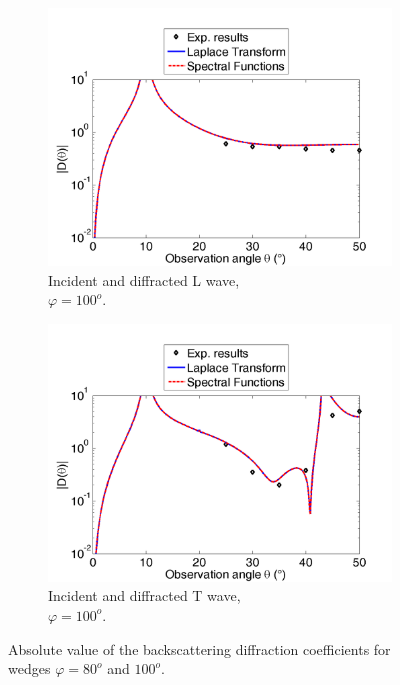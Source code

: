 \begin{figure}[h!]
     \begin{subfigure}[b]{0.49\textwidth}
        \includegraphics[width=\textwidth]{images/chapter3/Retrodiff_D_100_LL.png}
        \caption{Incident and diffracted L wave, \\ $\varphi=100^o$.}
        \label{C3:DLL100}
    \end{subfigure}
    \hfill
    \begin{subfigure}[b]{0.49\textwidth}
        \includegraphics[width=\textwidth]{images/chapter3/Retrodiff_D_100_TT.png}
        \caption{Incident and diffracted T wave, \\ $\varphi=100^o$.}
        \label{C3:DTT100}
     \end{subfigure}
     \caption{Absolute value of the backscattering diffraction coefficients for wedges $\varphi=80^o$ and $100^o$.}
     \label{C3:expcoeffs}
\end{figure}

